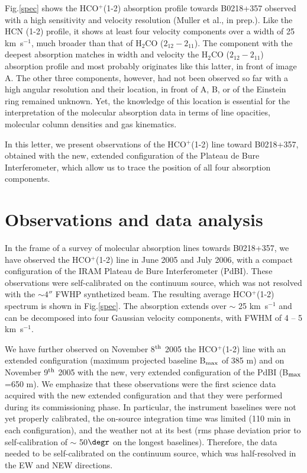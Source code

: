 \documentclass[oldversion]{aa}
\begin{document}
Fig.\ref{spec} shows the HCO$^+$(1-2) absorption profile towards B0218+357 observed with a
high sensitivity and velocity resolution (Muller et al., in prep.). Like the HCN (1-2)
profile, it shows at least four velocity components over a
width of 25 km~s$^{-1}$, much broader than that of H$_2$CO ($2_{12}-2_{11}$). The component
with the deepest absorption matches in width and velocity the H$_2$CO ($2_{12}-2_{11}$)
absorption profile and most probably originates like this latter, in front of image A.
The other three components, however, had not been observed so far with a high angular
resolution and their location, in front of A, B, or of the Einstein ring remained unknown.
Yet, the knowledge of this location is essential for the interpretation of the molecular
absorption data in terms of line opacities, molecular column densities and gas kinematics.

In this letter, we present observations of the HCO$^+$(1-2) line toward B0218+357, obtained
with the new, extended configuration of the Plateau de Bure Interferometer, which allow us
to trace the position of all four absorption components.


\section{Observations and data analysis}

In the frame of a survey of molecular absorption lines towards B0218+357,
we have observed the HCO$^+$(1-2) line in June 2005 and July 2006, with 
a compact configuration of the IRAM Plateau de Bure Interferometer (PdBI).  These observations were
self-calibrated on the continuum source, which was not resolved with the $\sim 4''$ FWHP
synthetized beam. The resulting average HCO$^+$(1-2) spectrum is shown in Fig.\ref{spec}.
The absorption extends over $\sim$ 25 km~s$^{-1}$ and can be decomposed into four Gaussian
velocity components, with FWHM of 4 -- 5 km~s$^{-1}$.

We have further observed on November 8$^{\rm th}$ 2005 the HCO$^+$(1-2) line with an
extended configuration (maximum projected baseline B$_{\rm max}$ of 385 m) and on November 9$^{\rm th}$ 2005 with the
new, very extended configuration of the PdBI (B$_{\rm max}$=650  m). We emphasize that these
observations were the first science data acquired with the new extended configuration and
that they were performed during its commissioning phase. In particular, the instrument
baselines were not yet properly calibrated, the on-source integration time was limited 
(110 min in each configuration), and the weather not at its best (rms phase deviation prior to
self-calibration of $\sim$ 50$\degr$ on the longest baselines). Therefore, the data needed to be
self-calibrated on the continuum source, which was half-resolved in the EW and NEW
directions. 
\end{document}
